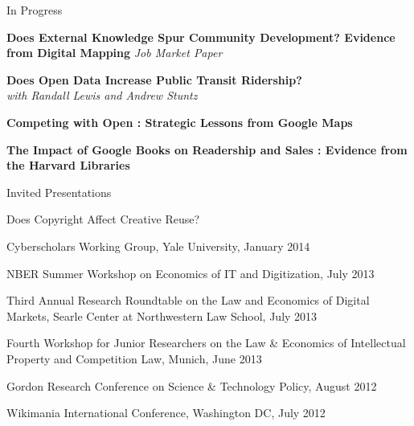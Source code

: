 \documentclass{resume} %
\begin{document}

\begin{rSection}{In Progress}

{\bf Does External Knowledge Spur Community Development? Evidence from Digital Mapping} \emph{Job Market Paper}

{\bf Does Open Data Increase Public Transit Ridership?} \\ \emph{with Randall Lewis and Andrew Stuntz}

{\bf Competing with Open : Strategic Lessons from Google Maps} 

{\bf The Impact of Google Books on Readership and Sales : Evidence from the Harvard Libraries}

\end{rSection}


\begin{rSection}{Invited Presentations}


\begin{rSubsection}{Does Copyright Affect Creative Reuse?}{}{}{}
\item Cyberscholars Working Group, Yale University, January 2014
\item NBER Summer Workshop on Economics of IT and Digitization, July 2013
\item Third Annual Research Roundtable on the Law and Economics of Digital Markets, Searle Center at Northwestern Law School, July 2013
\item Fourth Workshop for Junior Researchers on the Law \& Economics of Intellectual Property and Competition Law, Munich, June 2013
\item Gordon Research Conference on Science \& Technology Policy, August 2012
\item Wikimania International Conference, Washington DC, July 2012 
\end{rSubsection}

\end{rSection}
\end{document}
